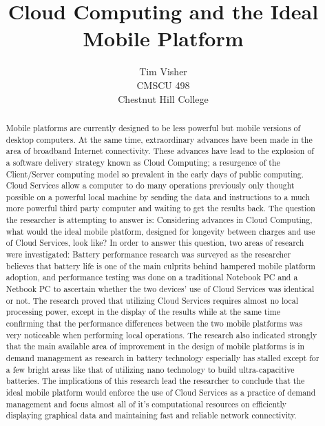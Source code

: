 \documentclass[12pt,oneside,letterpaper,titlepage]{report}
\author{Tim Visher\\ CMSCU 498\\ Chestnut Hill College}
\title{Cloud Computing and the Ideal Mobile Platform}
\begin{document}
\maketitle

\tableofcontents

\newpage

\begin{abstract}

Mobile platforms are currently designed to be less powerful but mobile versions
of desktop computers.  At the same time, extraordinary advances have been made
in the area of broadband Internet connectivity.  These advances have lead to the
explosion of a software delivery strategy known as Cloud Computing; a resurgence
of the Client/Server computing model so prevalent in the early days of public
computing.  Cloud Services allow a computer to do many operations previously
only thought possible on a powerful local machine by sending the data and
instructions to a much more powerful third party computer and waiting to get the
results back.  The question the researcher is attempting to answer is:
Considering advances in Cloud Computing, what would the ideal mobile platform,
designed for longevity between charges and use of Cloud Services, look like?  In
order to answer this question, two areas of research were investigated: Battery
performance research was surveyed as the researcher believes that battery life
is one of the main culprits behind hampered mobile platform adoption, and
performance testing was done on a traditional Notebook PC and a Netbook PC to
ascertain whether the two devices' use of Cloud Services was identical or not.
The research proved that utilizing Cloud Services requires almost no local
processing power, except in the display of the results while at the same time
confirming that the performance differences between the two mobile platforms was
very noticeable when performing local operations.  The research also indicated
strongly that the main available area of improvement in the design of mobile
platforms is in demand management as research in battery technology especially
has stalled except for a few bright areas like that of utilizing nano technology
to build ultra-capacitive batteries.  The implications of this research lead the
researcher to conclude that the ideal mobile platform would enforce the use of
Cloud Services as a practice of demand management and focus almost all of it's
computational resources on efficiently displaying graphical data and maintaining
fast and reliable network connectivity.

\end{abstract}
\end{document}
